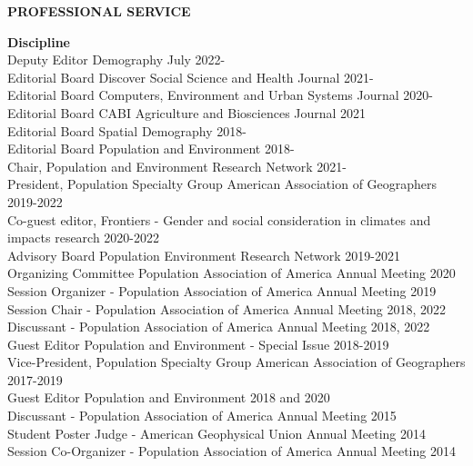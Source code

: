 \documentclass[11pt]{article} %
\begin{document}
\vspace{.5cm}
\noindent
{\large \textbf{PROFESSIONAL SERVICE}}
\vspace{.5cm}

\noindent

\noindent
\textbf{Discipline}\\
Deputy Editor Demography July 2022-\\
Editorial Board Discover Social Science and Health Journal 2021-\\
Editorial Board Computers, Environment and Urban Systems Journal 2020-\\
Editorial Board CABI Agriculture and Biosciences Journal 2021\\
Editorial Board Spatial Demography 2018-\\
Editorial Board Population and Environment 2018-\\
Chair, Population and Environment Research Network 2021-\\
President, Population Specialty Group American Association of Geographers 2019-2022\\
Co-guest editor, Frontiers - Gender and social consideration in climates and impacts research 2020-2022\\
Advisory Board Population Environment Research Network 2019-2021\\
Organizing Committee Population Association of America Annual Meeting 2020\\
Session Organizer - Population Association of America Annual Meeting 2019\\
Session Chair - Population Association of America Annual Meeting 2018, 2022\\
Discussant - Population Association of America Annual Meeting 2018, 2022\\
Guest Editor Population and Environment - Special Issue 2018-2019\\
Vice-President, Population Specialty Group American Association of Geographers 2017-2019\\
Guest Editor Population and Environment 2018 and 2020\\
Discussant - Population Association of America Annual Meeting 2015\\
Student Poster Judge - American Geophysical Union Annual Meeting 2014\\
Session Co-Organizer - Population Association of America Annual Meeting 2014\\
\end{document}
